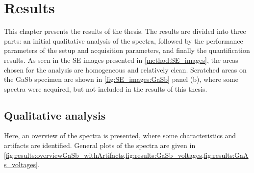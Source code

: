 \chapter{Results}
\label{ch:results}




This chapter presents the results of the thesis.
The results are divided into three parts: an initial qualitative analysis of the spectra, followed by the performance parameters of the setup and acquisition parameters, and finally the quantification results.
As seen in the SE images presented in \cref{method:SE_images}, the areas chosen for the analysis are homogeneous and relatively clean.
Scratched areas on the GaSb specimen are shown in \cref{fig:SE_images:GaSb} panel (b), where some spectra were acquired, but not included in the results of this thesis.



\section{Qualitative analysis}
\label{results:qualitative_analysis}

Here, an overview of the spectra is presented, where some characteristics and artifacts are identified.
General plots of the spectra are given in \cref{fig:results:overviewGaSb_withArtifacts,fig:results:GaSb_voltages,fig:results:GaAs_voltages}.

